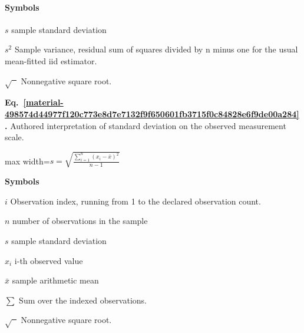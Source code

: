 \documentclass[11pt,a4paper]{article}
\begin{document}
\paragraph{Symbols}
\par\noindent\textbf{\(s\)} sample standard deviation
\par\noindent\textbf{\(s^2\)} Sample variance, residual sum of squares divided by n minus one for the usual mean-fitted iid estimator.
\par\noindent\textbf{\(\sqrt{\phantom{x}}\)} Nonnegative square root.
\medskip

\par\medskip
\begin{samepage}
\label{material-498574d44977f120c773e8d7e7132f9f650601fb3715f0c84828e6f9de00a284}
\noindent\textbf{Eq.~\ref*{material-498574d44977f120c773e8d7e7132f9f650601fb3715f0c84828e6f9de00a284}.} Authored interpretation of standard deviation on the observed measurement scale.\par\nopagebreak
\begin{center}\begin{adjustbox}{max width=\linewidth}$\displaystyle s=\sqrt{\frac{\sum_{i=1}^{n}(x_i-\bar{x})^2}{n-1}}$\end{adjustbox}\end{center}

\par\noindent\textbf{Symbols}

\par\noindent\textbf{\(i\)} Observation index, running from 1 to the declared observation count.

\par\noindent\textbf{\(n\)} number of observations in the sample

\par\noindent\textbf{\(s\)} sample standard deviation

\par\noindent\textbf{\(x_i\)} i-th observed value

\par\noindent\textbf{\(\bar{x}\)} sample arithmetic mean

\par\noindent\textbf{\(\sum\)} Sum over the indexed observations.

\par\noindent\textbf{\(\sqrt{\phantom{x}}\)} Nonnegative square root.

\end{samepage}
\medskip
\end{document}
